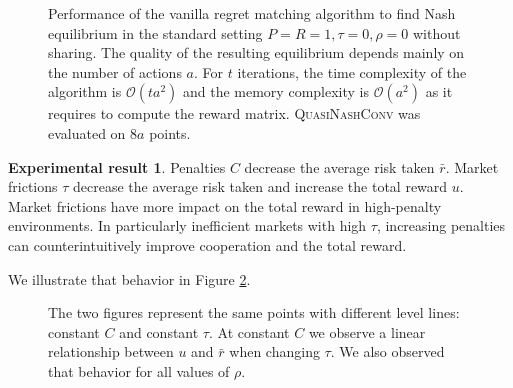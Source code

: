 \documentclass[preprint,12pt,authoryear,doubleblind]{elsarticle}
\theoremstyle{definition}
\newtheorem{result}[theorem]{Experimental result}
\begin{document}
\begin{figure}[htbp]
  \centering
  \begin{minipage}[t]{0.48\textwidth}
    \centering
    
  \end{minipage}
  \hfill
  \begin{minipage}[t]{0.48\textwidth}
    \centering
    
  \end{minipage}
  \caption{Performance of the vanilla regret matching algorithm to find Nash equilibrium in the standard setting $P=R=1, \tau=0, \rho=0$ without sharing. The quality of the resulting equilibrium depends mainly on the number of actions $a$. For $t$ iterations, the time complexity of the algorithm is $\mathcal{O}(t a^2)$ and the memory complexity is $\mathcal{O}(a^2)$ as it requires to compute the reward matrix. \textsc{QuasiNashConv} was evaluated on $8 a$ points.}
  \label{fig:rm-size}  
\end{figure}

\begin{result}

    Penalties $C$ decrease the average risk taken $\bar r$. Market frictions $\tau$ decrease the average risk taken and increase the total reward $u$. Market frictions have more impact on the total reward in high-penalty environments.
    In particularly inefficient markets with high $\tau$, increasing penalties can counterintuitively improve cooperation and the total reward.
\end{result}

We illustrate that behavior in Figure \ref{fig:result-noise}.


\begin{figure}[htbp]
  \centering
  \begin{minipage}[t]{0.48\textwidth}
    \centering
    
  \end{minipage}
  \hfill
  \begin{minipage}[t]{0.48\textwidth}
    \centering
    
  \end{minipage}
  \caption{The two figures represent the same points with different level lines: constant $C$ and constant $\tau$. At constant $C$ we observe a linear relationship between $u$ and $\bar r$ when changing $\tau$. We also observed that behavior for all values of $\rho$.}
  \label{fig:result-noise}  
\end{figure}
\end{document}
